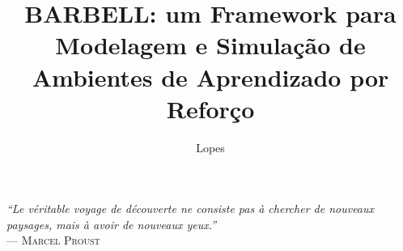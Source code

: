 \documentclass[cic,tc]{iiufrgs}
\title{BARBELL: um Framework para Modelagem e Simulação de Ambientes de Aprendizado por Reforço}
\author{Lopes}{Henrique de Paula}
\newcommand\bruno[1]{\textcolor{magenta}{#1}}
\begin{document}
    
    \maketitle
    
    \clearpage
    \begin{flushright}
        \mbox{}\vfill
        {\sffamily\itshape
          ``Le véritable voyage de découverte ne consiste pas à chercher de nouveaux paysages,
          mais à avoir de nouveaux yeux.''\\}
        --- \textsc{Marcel Proust}
    \end{flushright}
    
    
    
    
    
\end{document}
